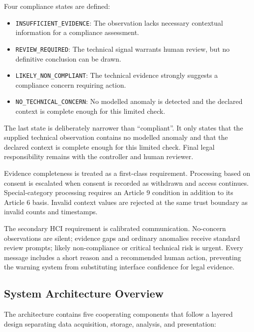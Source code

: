 Four compliance states are defined:
\begin{itemize}
\item \texttt{INSUFFICIENT\_EVIDENCE}: The observation lacks necessary contextual information for a compliance assessment.
\item \texttt{REVIEW\_REQUIRED}: The technical signal warrants human review, but no definitive conclusion can be drawn.
\item \texttt{LIKELY\_NON\_COMPLIANT}: The technical evidence strongly suggests a compliance concern requiring action.
\item \texttt{NO\_TECHNICAL\_CONCERN}: No modelled anomaly is detected and the declared context is complete enough for this limited check.
\end{itemize}

The last state is deliberately narrower than ``compliant''. It only states that the supplied technical observation contains no modelled anomaly and that the declared context is complete enough for this limited check. Final legal responsibility remains with the controller and human reviewer.

Evidence completeness is treated as a first-class requirement. Processing based on consent is escalated when consent is recorded as withdrawn and access continues. Special-category processing requires an Article 9 condition in addition to its Article 6 basis. Invalid context values are rejected at the same trust boundary as invalid counts and timestamps.

The secondary HCI requirement is calibrated communication. No-concern observations are silent; evidence gaps and ordinary anomalies receive standard review prompts; likely non-compliance or critical technical risk is urgent. Every message includes a short reason and a recommended human action, preventing the warning system from substituting interface confidence for legal evidence.

\subsection{System Architecture Overview}

The architecture contains five cooperating components that follow a layered design separating data acquisition, storage, analysis, and presentation:

